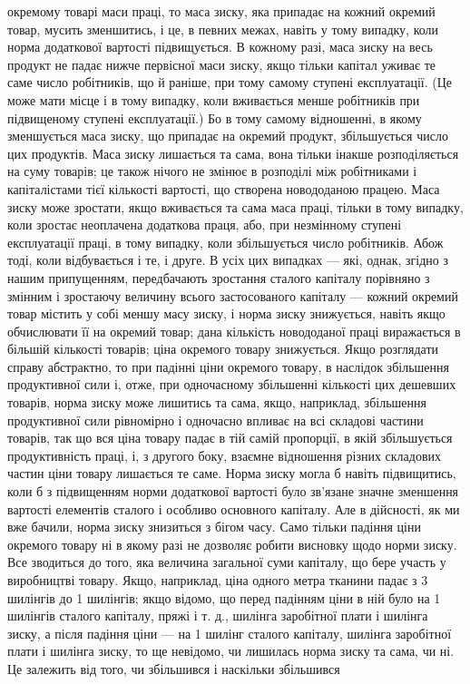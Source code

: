 \parcont{}  %
окремому товарі маси праці, то маса зиску, яка припадає на кожний окремий товар, мусить зменшитись,
і це, в певних межах, навіть у тому випадку, коли норма додаткової вартості підвищується. В кожному
разі, маса зиску на весь продукт не падає нижче первісної маси зиску, якщо тільки капітал уживає те
саме число робітників, що й раніше, при тому самому ступені експлуатації. (Це може мати місце і в
тому випадку, коли вживається менше робітників при підвищеному ступені експлуатації.) Бо в тому
самому відношенні, в якому зменшується маса зиску, що припадає на окремий продукт, збільшується
число цих продуктів. Маса зиску лишається та сама, вона тільки інакше розподіляється на суму
товарів; це також нічого не змінює в розподілі між робітниками і капіталістами тієї кількості
вартості, що створена новододаною працею. Маса зиску може зростати, якщо вживається та сама маса
праці, тільки в тому випадку, коли зростає неоплачена додаткова праця, або, при незмінному ступені
експлуатації праці, в тому випадку, коли збільшується число робітників. Абож тоді, коли відбувається
і те, і друге. В усіх цих випадках — які, однак, згідно з нашим припущенням, передбачають зростання
сталого капіталу порівняно з змінним і зростаючу величину всього застосованого капіталу — кожний
окремий товар містить у собі меншу масу зиску, і норма зиску знижується, навіть якщо обчислювати її
на окремий товар; дана кількість новододаної праці виражається в більшій кількості товарів; ціна
окремого товару знижується. Якщо
розглядати справу абстрактно, то при падінні ціни окремого товару, в наслідок збільшення
продуктивної сили і, отже, при одночасному збільшенні кількості цих дешевших товарів, норма зиску
може лишитись та сама, якщо, наприклад, збільшення продуктивної сили рівномірно і одночасно впливає
на всі складові частини товарів, так що вся ціна товару падає в тій самій пропорції, в якій
збільшується продуктивність праці, і, з другого боку, взаємне відношення різних складових частин
ціни товару лишається те саме. Норма зиску могла б навіть підвищитись, коли б з підвищенням норми
додаткової вартості було зв’язане значне зменшення вартості елементів сталого і особливо основного
капіталу. Але в дійсності, як ми вже бачили, норма зиску знизиться з бігом часу. Само тільки падіння
ціни окремого товару ні в якому разі не дозволяє робити висновку щодо норми зиску. Все зводиться до
того, яка величина загальної суми капіталу, що бере участь у виробництві товару. Якщо, наприклад,
ціна одного метра тканини падає з 3 шилінгів до 1  шилінгів; якщо відомо, що перед падінням ціни
в ній було на 1  шилінгів сталого капіталу, пряжі і т. д.,   шилінга заробітної плати і 
шилінга зиску, а після падіння ціни — на 1 шилінг сталого капіталу,   шилінга заробітної плати і
  шилінга зиску, то ще невідомо, чи лишилась норма зиску та сама, чи ні. Це залежить від того, чи
збільшився і наскільки збільшився
\parbreak{}  %
